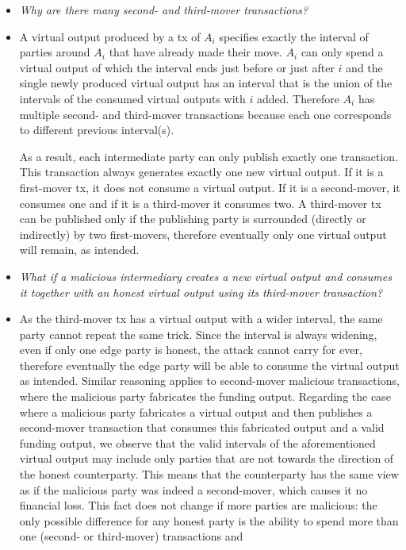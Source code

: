 \begin{itemize}
  \item \emph{Why are there many second- and third-mover transactions?}
  \item A virtual output produced by a tx of $A_i$ specifies exactly the
  interval of parties around $A_i$ that have already made their move. $A_i$ can
  only spend a virtual output of which the interval ends just before or just
  after $i$ and the single newly produced virtual output has an interval that is
  the union of the intervals of the consumed virtual outputs with $i$ added.
  Therefore $A_i$ has multiple second- and third-mover transactions because each
  one corresponds to different previous interval(s).

  As a result, each intermediate party can only publish exactly one transaction.
  This transaction always generates exactly one new virtual output. If it is a
  first-mover tx, it does not consume a virtual output. If it is a second-mover,
  it consumes one and if it is a third-mover it consumes two. A third-mover tx
  can be published only if the publishing party is surrounded (directly or
  indirectly) by two first-movers, therefore eventually only one virtual output
  will remain, as intended.
  \item \emph{What if a malicious intermediary creates a new virtual output and
  consumes it together with an honest virtual output using its third-mover
  transaction?}
  \item As the third-mover tx has a virtual output with a wider interval, the
  same party cannot repeat the same trick. Since the interval is always
  widening, even if only one edge party is honest, the attack cannot carry for
  ever, therefore eventually the edge party will be able to consume the virtual
  output as intended. Similar reasoning applies to second-mover malicious
  transactions, where the malicious party fabricates the funding output.
  Regarding the case where a malicious party fabricates a virtual output and
  then publishes a second-mover transaction that consumes this fabricated output
  and a valid funding output, we observe that the valid intervals of the
  aforementioned virtual output may include only parties that are not towards
  the direction of the honest counterparty. This means that the counterparty
  has the same view as if the malicious party was indeed a second-mover, which
  causes it no financial loss. This fact does not change if more parties
  are malicious: the only possible difference for any honest party is the
  ability to spend more than one (second- or third-mover) transactions and

\end{itemize}
